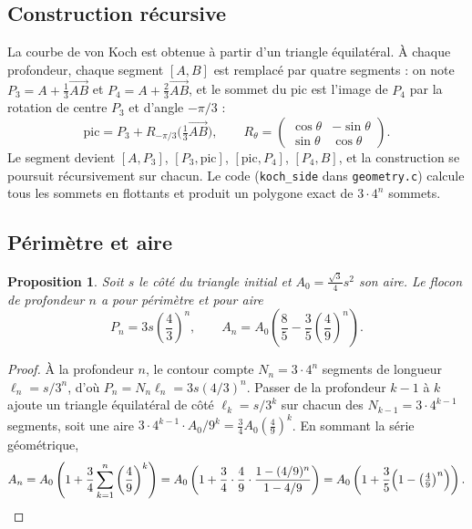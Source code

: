 \documentclass[11pt,a4paper]{article}
\newtheorem{proposition}{Proposition}
\theoremstyle{definition}
\theoremstyle{remark}
\begin{document}
\subsection{Construction récursive}

La courbe de von Koch \cite{koch1904} est obtenue à partir d'un triangle équilatéral. À chaque profondeur, chaque segment $[A,B]$ est
remplacé par quatre segments : on note $P_3 = A + \tfrac13\overrightarrow{AB}$ et
$P_4 = A + \tfrac23\overrightarrow{AB}$, et le sommet du pic est l'image de $P_4$
par la rotation de centre $P_3$ et d'angle $-\pi/3$ :
\[
\text{pic} = P_3 + R_{-\pi/3}\Big(\tfrac13\overrightarrow{AB}\Big),\qquad
R_\theta = \begin{pmatrix}\cos\theta & -\sin\theta\\ \sin\theta & \cos\theta\end{pmatrix}.
\]
Le segment devient $[A,P_3]$, $[P_3,\text{pic}]$, $[\text{pic},P_4]$, $[P_4,B]$, et
la construction se poursuit récursivement sur chacun. Le code
(\texttt{koch\_side} dans \texttt{geometry.c}) calcule tous les sommets en
flottants et produit un polygone exact de $3\cdot 4^n$ sommets.

\subsection{Périmètre et aire}

\begin{proposition}\label{prop-koch}
Soit $s$ le côté du triangle initial et $A_0 = \frac{\sqrt3}{4}s^2$ son aire. Le
flocon de profondeur $n$ a pour périmètre et pour aire
\[
P_n = 3s\left(\frac43\right)^{n},\qquad
A_n = A_0\left(\frac85 - \frac35\left(\frac49\right)^{n}\right).
\]
\end{proposition}

\begin{proof}
À la profondeur $n$, le contour compte $N_n = 3\cdot4^n$ segments de longueur
$\ell_n = s/3^n$, d'où $P_n = N_n\ell_n = 3s(4/3)^n$. Passer de la profondeur $k-1$
à $k$ ajoute un triangle équilatéral de côté $\ell_k = s/3^k$ sur chacun des
$N_{k-1} = 3\cdot4^{k-1}$ segments, soit une aire
$3\cdot4^{k-1}\cdot A_0/9^k = \frac34 A_0 \left(\frac49\right)^k$. En sommant la
série géométrique,
\[
A_n = A_0\left(1 + \frac34\sum_{k=1}^{n}\left(\frac49\right)^k\right)
    = A_0\left(1 + \frac34\cdot\frac49\cdot\frac{1-(4/9)^n}{1-4/9}\right)
    = A_0\left(1 + \frac35\Big(1-\big(\tfrac49\big)^n\Big)\right). \qedhere
\]
\end{proof}
\end{document}

